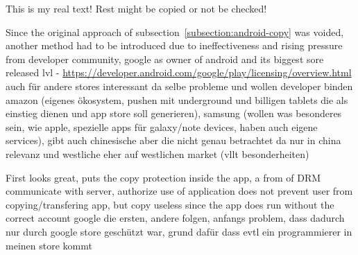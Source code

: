 This is my real text! Rest might be copied or not be checked!

Since the original approach of subsection~\ref{subsection:android-copy} was voided, another method had to be introduced due to ineffectiveness and rising pressure from developer community, google as owner of android and its biggest sore released lvl - \url{https://developer.android.com/google/play/licensing/overview.html}
auch für andere stores interessant da selbe probleme und wollen developer binden
amazon (eigenes ökosystem, pushen mit underground und billigen tablets die als einstieg dienen und app store soll generieren), samsung (wollen was besonderes sein, wie apple, spezielle apps für galaxy/note devices, haben auch eigene services), gibt auch chinesische aber die nicht genau betrachtet da nur in china relevanz und westliche eher auf westlichen market (vllt besonderheiten)
\cite{munteanLicense}





First looks great, puts the copy protection inside the app, a from of DRM\newline
communicate with server, authorize use of application\newline
does not prevent user from copying/transfering app, but copy useless since the app does run without the correct account\newline
google die ersten, andere folgen, anfangs problem, dass dadurch nur durch google store geschützt war, grund dafür dass evtl ein programmierer in meinen store kommt\newline
